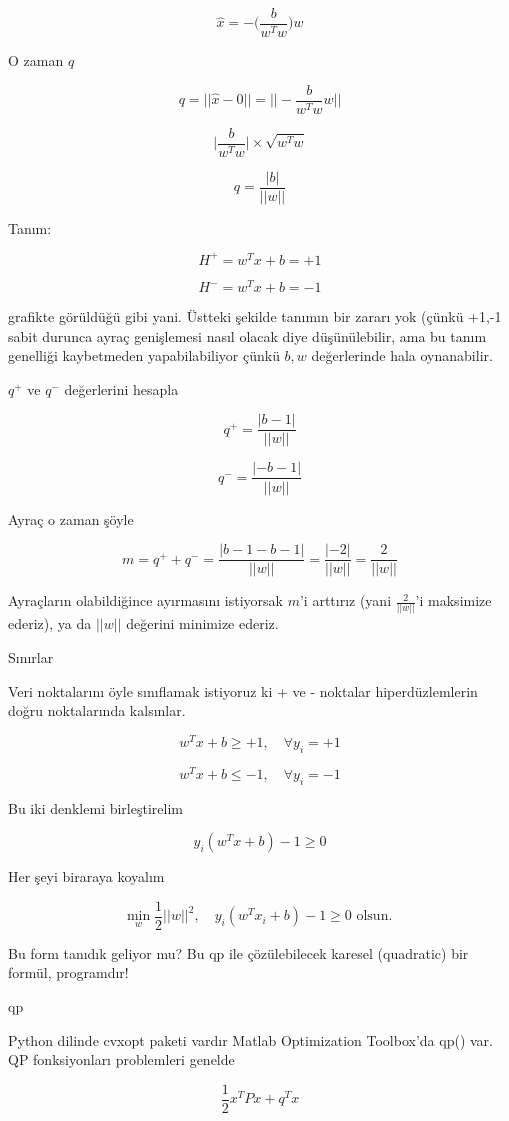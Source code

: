 \documentclass[12pt,fleqn]{article}\usepackage{../../common}
\begin{document}
$$ \hat{x} = - \bigg( \frac{b}{w^Tw}  \bigg) w $$

O zaman $q$

$$ q = || \hat{x}-0 || = \bigg|\bigg| -  \frac{b}{w^Tw} w \bigg|\bigg|  $$

$$ \big|\frac{b}{w^Tw}\big| \times \sqrt{w^Tw}  $$

$$ q = \frac{|b|}{||w||} $$

Tanım:

$$ H^{+} = w^{T}x + b=+1 $$

$$ H^{-} = w^{T}x + b=-1 $$

grafikte görüldüğü gibi yani. Üstteki şekilde tanımın bir zararı yok (çünkü
+1,-1 sabit durunca ayraç genişlemesi nasıl olacak diye düşünülebilir, ama bu
tanım genelliği kaybetmeden yapabilabiliyor çünkü $b,w$ değerlerinde hala
oynanabilir.

$q^{+}$ ve $q^{-}$ değerlerini hesapla

$$ q^{+} = \frac{|b-1|}{||w||} $$

$$ q^{-} = \frac{|-b-1|}{||w||} $$

Ayraç o zaman şöyle 

$$ m=q^{+}+q^{-} =
\frac{|b-1-b-1|}{||w||} = \frac{|-2|}{||w||} = \frac{2}{||w||} $$

Ayraçların olabildiğince ayırmasını istiyorsak $m$'i arttırız (yani
$\frac{2}{||w||}$'i maksimize ederiz), ya da $||w||$ değerini minimize
ederiz. 

Sınırlar

Veri noktalarını öyle sınıflamak istiyoruz ki + ve - noktalar
hiperdüzlemlerin doğru noktalarında kalsınlar. 

$$ w^{T}x+b \geq +1, \quad \forall y_{i}=+1   $$

$$ w^{T}x+b \leq -1, \quad \forall y_{i}=-1  $$

Bu iki denklemi birleştirelim

$$ y_{i}(w^{T}x+b)-1 \geq 0  $$

Her şeyi biraraya koyalım

$$ \min_w \frac{1}{2}{||w||^2}, \quad y_{i}(w^Tx_{i}+b)-1 \ge 0
\textrm{ olsun. }$$


Bu form tanıdık geliyor mu? Bu qp ile çözülebilecek karesel (quadratic)
bir formül, programdır!

qp

Python dilinde cvxopt paketi vardır Matlab Optimization Toolbox'da qp() var. QP
fonksiyonları problemleri genelde

$$\frac{1}{2}x^{T}Px+q^{T}x$$
\end{document}
